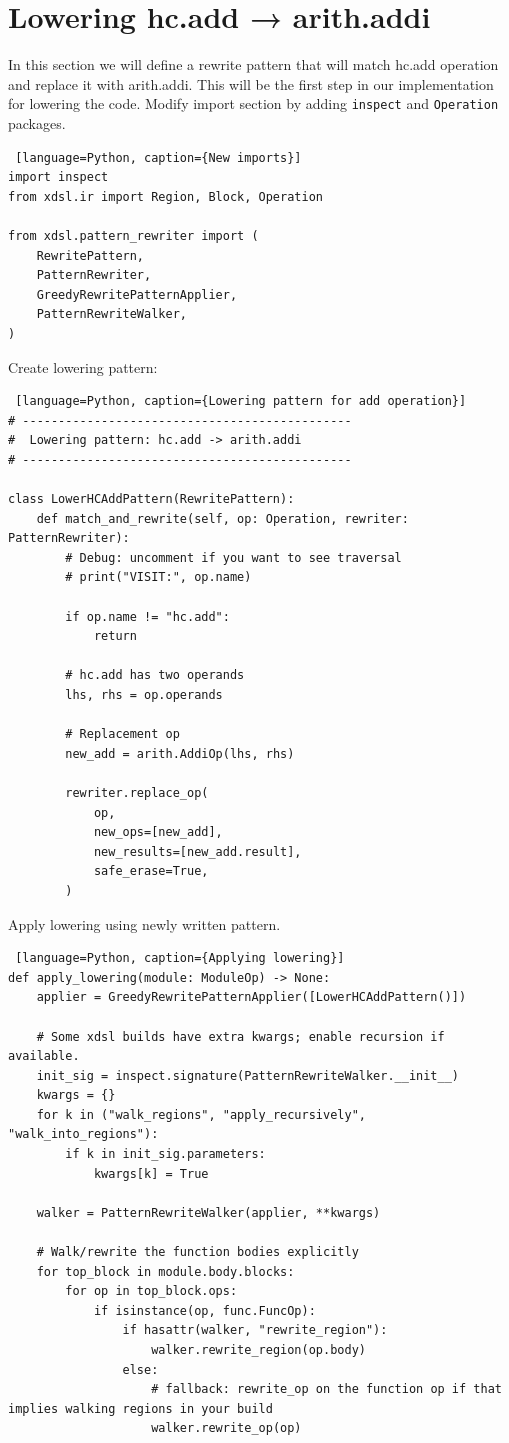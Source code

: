 \documentclass[../main.tex]{subfiles}
\begin{document}
\section{Lowering hc.add → arith.addi}
In this section we will define a rewrite pattern that will match hc.add operation and replace it with arith.addi.
This will be the first step in our implementation for lowering the code.
Modify import section by adding \texttt{inspect} and \texttt{Operation} packages.
\begin{lstlisting} [language=Python, caption={New imports}]
import inspect
from xdsl.ir import Region, Block, Operation

from xdsl.pattern_rewriter import (
    RewritePattern,
    PatternRewriter,
    GreedyRewritePatternApplier,
    PatternRewriteWalker,
)
\end{lstlisting}
Create lowering pattern:
\begin{lstlisting} [language=Python, caption={Lowering pattern for add operation}]
# ----------------------------------------------
#  Lowering pattern: hc.add -> arith.addi
# ----------------------------------------------

class LowerHCAddPattern(RewritePattern):
    def match_and_rewrite(self, op: Operation, rewriter: PatternRewriter):
        # Debug: uncomment if you want to see traversal
        # print("VISIT:", op.name)

        if op.name != "hc.add":
            return

        # hc.add has two operands
        lhs, rhs = op.operands

        # Replacement op
        new_add = arith.AddiOp(lhs, rhs)

        rewriter.replace_op(
            op,
            new_ops=[new_add],
            new_results=[new_add.result],
            safe_erase=True,
        )
\end{lstlisting}
Apply lowering using newly written pattern.
\begin{lstlisting} [language=Python, caption={Applying lowering}]
def apply_lowering(module: ModuleOp) -> None:
    applier = GreedyRewritePatternApplier([LowerHCAddPattern()])

    # Some xdsl builds have extra kwargs; enable recursion if available.
    init_sig = inspect.signature(PatternRewriteWalker.__init__)
    kwargs = {}
    for k in ("walk_regions", "apply_recursively", "walk_into_regions"):
        if k in init_sig.parameters:
            kwargs[k] = True

    walker = PatternRewriteWalker(applier, **kwargs)

    # Walk/rewrite the function bodies explicitly
    for top_block in module.body.blocks:
        for op in top_block.ops:
            if isinstance(op, func.FuncOp):
                if hasattr(walker, "rewrite_region"):
                    walker.rewrite_region(op.body)
                else:
                    # fallback: rewrite_op on the function op if that implies walking regions in your build
                    walker.rewrite_op(op)
\end{lstlisting}
\end{document}
